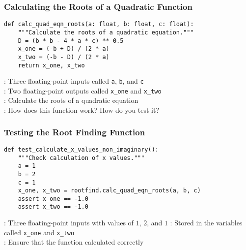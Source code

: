 \documentclass[14pt,aspectratio=169]{beamer}
\begin{document}
%
\begin{frame}[fragile]
  \frametitle{Calculating the Roots of a Quadratic Function}
  \hspace*{-.2in}
  \begin{minipage}{6in}
    \vspace*{.2in}
    \begin{verbatim}
def calc_quad_eqn_roots(a: float, b: float, c: float):
    """Calculate the roots of a quadratic equation."""
    D = (b * b - 4 * a * c) ** 0.5
    x_one = (-b + D) / (2 * a)
    x_two = (-b - D) / (2 * a)
    return x_one, x_two
    \end{verbatim}
  \end{minipage}
  \vspace*{.05in}
  \begin{center}
    \normalsize {}: Three floating-point inputs called {\tt a}, {\tt b}, and {\tt c}\\
    \normalsize {}: Two floating-point outputs called {\tt x\_one} and {\tt x\_two}\\
    \normalsize {}: Calculate the roots of a quadratic equation\\
    \normalsize {}: How does this function work? How do you test it?
  \end{center}
\end{frame}

%
\begin{frame}[fragile]
  \frametitle{Testing the Root Finding Function}
  \hspace*{-.2in}
  \begin{minipage}{6in}
    \vspace*{.2in}
    \begin{verbatim}
def test_calculate_x_values_non_imaginary():
    """Check calculation of x values."""
    a = 1
    b = 2
    c = 1
    x_one, x_two = rootfind.calc_quad_eqn_roots(a, b, c)
    assert x_one == -1.0
    assert x_two == -1.0
    \end{verbatim}
  \end{minipage}
  \vspace*{.05in}
  \begin{center}
    \normalsize {}: Three floating-point inputs with values of $1$, $2$, and $1$
    \normalsize {}: Stored in the variables called {\tt x\_one} and {\tt x\_two}\\
    \normalsize {}: Ensure that the function calculated correctly\\
  \end{center}
\end{frame}
\end{document}
